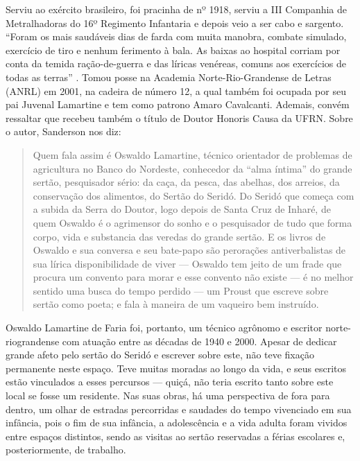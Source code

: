 \begin{refsection}
    Serviu ao exército brasileiro, foi pracinha de nº 1918, serviu a III Companhia de Metralhadoras do 16º Regimento Infantaria e depois veio a ser cabo e sargento. “Foram os mais saudáveis dias de farda com muita manobra, combate simulado, exercício de tiro e nenhum ferimento à bala. As baixas ao hospital corriam por conta da temida ração-de-guerra e das líricas venéreas, comuns aos exercícios de todas as terras” \cite[p.~46]{CAMPOS2001alpendres}. Tomou posse na Academia Norte-Rio-Grandense de Letras (ANRL) em 2001, na cadeira de número 12, a qual também foi ocupada por seu pai Juvenal Lamartine e tem como patrono Amaro Cavalcanti. Ademais, convém ressaltar que recebeu também o título de Doutor Honoris Causa da UFRN. Sobre o autor, Sanderson \textcite[p.~237]{NEGREIROSAnderson2001direção} nos diz: 

    \begin{quotation}
        Quem fala assim é Oswaldo Lamartine, técnico orientador de problemas de agricultura no Banco do Nordeste, conhecedor da “alma íntima” do grande sertão, pesquisador sério: da caça, da pesca, das abelhas, dos arreios, da conservação dos alimentos, do Sertão do Seridó. Do Seridó que começa com a subida da Serra do Doutor, logo depois de Santa Cruz de Inharé, de quem Oswaldo é o agrimensor do sonho e o pesquisador de tudo que forma corpo, vida e substancia das veredas do grande sertão. E os livros de Oswaldo e sua conversa e seu bate-papo são perorações antiverbalistas de sua lírica disponibilidade de viver --- Oswaldo tem jeito de um frade que procura um convento para morar e esse convento não existe --- é no melhor sentido uma busca do tempo perdido --- um Proust que escreve sobre sertão como poeta; e fala à maneira de um vaqueiro bem instruído. 
    \end{quotation}

    Oswaldo Lamartine de Faria foi, portanto, um técnico agrônomo e escritor norte-riograndense com atuação entre as décadas de 1940 e 2000. Apesar de dedicar grande afeto pelo sertão do Seridó e escrever sobre este, não teve fixação permanente neste espaço. Teve muitas moradas ao longo da vida, e seus escritos estão vinculados a esses percursos --- quiçá, não teria escrito tanto sobre este local se fosse um residente. Nas suas obras, há uma perspectiva de fora para dentro, um olhar de estradas percorridas e saudades do tempo vivenciado em sua infância, pois o fim de sua infância, a adolescência e a vida adulta foram vividos entre espaços distintos, sendo as visitas ao sertão reservadas a férias escolares e, posteriormente, de trabalho.  


\end{refsection}
